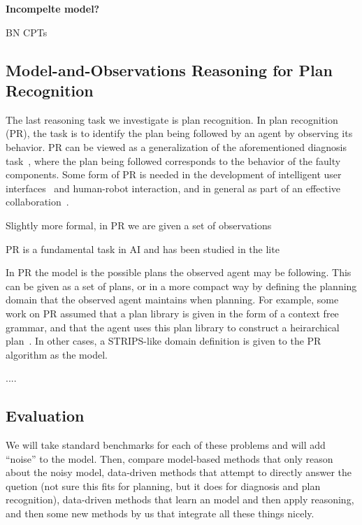 \documentclass[12pt]{article}
\begin{document}
{\bf Incompelte model?}


BN 
CPTs




\subsection{Model-and-Observations Reasoning for Plan Recognition}
The last reasoning task we investigate is plan recognition. In plan recognition (PR), the task is to identify the plan being followed by an agent by observing its behavior. PR can be viewed as a generalization of the aforementioned diagnosis task~\cite{mclaraith}, where the plan being followed corresponds to the behavior of the faulty components. 
Some form of PR is needed in the development of intelligent user interfaces~\cite{} and human-robot interaction, and in general as part of an effective collaboration~\cite{todo}. 

Slightly more formal, in PR we are given a set of observations 

PR is a fundamental task in AI and has been studied in the lite

In PR the model is the possible plans the observed agent may be following. This can be given as a set of plans, or in a more compact way by defining the planning domain that the observed agent maintains when planning. For example, some work on PR assumed that a plan library is given in the form of a context free grammar, and that the agent uses this plan library to construct a heirarchical plan~\cite{}. In other cases, a STRIPS-like domain definition is given to the PR algorithm as the model. 

....






\subsection{Evaluation}

We will take standard benchmarks for each of these problems and will add ``noise'' to the model. Then, compare model-based methods that only reason about the noisy model, data-driven methods that attempt to directly answer the quetion (not sure this fits for planning, but it does for diagnosis and plan recognition), data-driven methods that learn an model and then apply reasoning, 
and then some new methods by us that integrate all these things nicely. 


\end{document}
